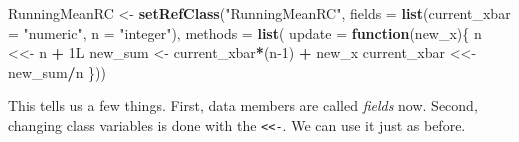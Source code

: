 \documentclass[12pt,krantz2]{krantz}
\makeatletter
\newenvironment{Shaded}{\begin{snugshade}}{\end{snugshade}}
\newcommand{\CommentTok}[1]{\textcolor[rgb]{0.37,0.37,0.37}{\textit{#1}}}
\newcommand{\ControlFlowTok}[1]{\textcolor[rgb]{0.27,0.27,0.27}{\textbf{#1}}}
\newcommand{\DataTypeTok}[1]{\textcolor[rgb]{0.27,0.27,0.27}{#1}}
\newcommand{\DecValTok}[1]{\textcolor[rgb]{0.06,0.06,0.06}{#1}}
\newcommand{\FloatTok}[1]{\textcolor[rgb]{0.06,0.06,0.06}{#1}}
\newcommand{\KeywordTok}[1]{\textcolor[rgb]{0.27,0.27,0.27}{\textbf{#1}}}
\newcommand{\NormalTok}[1]{#1}
\newcommand{\OperatorTok}[1]{\textcolor[rgb]{0.43,0.43,0.43}{\textbf{#1}}}
\newcommand{\StringTok}[1]{\textcolor[rgb]{0.5,0.5,0.5}{#1}}
\newenvironment{kframe}{%
\medskip{}
\setlength{\fboxsep}{.8em}
 \def\at@end@of@kframe{}%
 \ifinner\ifhmode%
  \def\at@end@of@kframe{\end{minipage}}%
  \begin{minipage}{\columnwidth}%
 \fi\fi%
 \def\FrameCommand##1{\hskip\@totalleftmargin \hskip-\fboxsep
 \colorbox{shadecolor}{##1}\hskip-\fboxsep
     \hskip-\linewidth \hskip-\@totalleftmargin \hskip\columnwidth}%
 \MakeFramed {\advance\hsize-\width
   \@totalleftmargin\z@ \linewidth\hsize
   \@setminipage}}%
 {\par\unskip\endMakeFramed%
 \at@end@of@kframe}
\renewenvironment{Shaded}{\begin{kframe}}{\end{kframe}}
\makeatother
\begin{document}
\begin{Shaded}
\begin{Highlighting}[]
\NormalTok{RunningMeanRC <-}\StringTok{ }\KeywordTok{setRefClass}\NormalTok{(}\StringTok{"RunningMeanRC"}\NormalTok{, }
                             \DataTypeTok{fields =} \KeywordTok{list}\NormalTok{(}\DataTypeTok{current_xbar =} \StringTok{"numeric"}\NormalTok{,}
                                           \DataTypeTok{n =} \StringTok{"integer"}\NormalTok{),}
                             \DataTypeTok{methods =} \KeywordTok{list}\NormalTok{(}
                               \DataTypeTok{update =} \ControlFlowTok{function}\NormalTok{(new_x)\{}
\NormalTok{                                 n <<-}\StringTok{ }\NormalTok{n }\OperatorTok{+}\StringTok{ }\NormalTok{1L}
\NormalTok{                                 new_sum <-}\StringTok{ }\NormalTok{current_xbar}\OperatorTok{*}\NormalTok{(n}\DecValTok{-1}\NormalTok{) }\OperatorTok{+}\StringTok{ }\NormalTok{new_x}
\NormalTok{                                 current_xbar <<-}\StringTok{ }\NormalTok{new_sum}\OperatorTok{/}\NormalTok{n}
\NormalTok{                                \}))}
\end{Highlighting}
\end{Shaded}

This tells us a few things. First, data members are called \emph{fields} now. Second, changing class variables is done with the \texttt{\textless{}\textless{}-}. We can use it just as before.

\begin{Shaded}
\end{Shaded}
\end{document}
